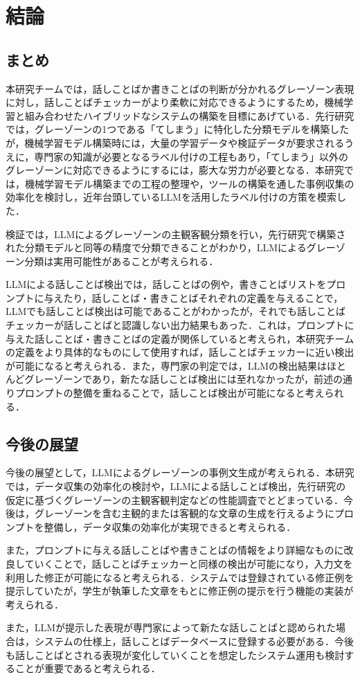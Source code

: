 \chapter{結論 \label{c8}}

\section{まとめ}
本研究チームでは，話しことばか書きことばの判断が分かれるグレーゾーン表現に対し，話しことばチェッカーがより柔軟に対応できるようにするため，機械学習と組み合わせたハイブリッドなシステムの構築を目標にあげている．先行研究では，グレーゾーンの1つである「てしまう」に特化した分類モデルを構築したが，機械学習モデル構築時には，大量の学習データや検証データが要求されるうえに，専門家の知識が必要となるラベル付けの工程もあり，「てしまう」以外のグレーゾーンに対応できるようにするには，膨大な労力が必要となる．本研究では，機械学習モデル構築までの工程の整理や，ツールの構築を通した事例収集の効率化を検討し，近年台頭しているLLMを活用したラベル付けの方策を模索した．

検証では，LLMによるグレーゾーンの主観客観分類を行い，先行研究で構築された分類モデルと同等の精度で分類できることがわかり，LLMによるグレーゾーン分類は実用可能性があることが考えられる．

LLMによる話しことば検出では，話しことばの例や，書きことばリストをプロンプトに与えたり，話しことば・書きことばそれぞれの定義を与えることで，LLMでも話しことば検出は可能であることがわかったが，それでも話しことばチェッカーが話しことばと認識しない出力結果もあった．これは，プロンプトに与えた話しことば・書きことばの定義が関係していると考えられ，本研究チームの定義をより具体的なものにして使用すれば，話しことばチェッカーに近い検出が可能になると考えられる．また，専門家の判定では，LLMの検出結果はほとんどグレーゾーンであり，新たな話しことば検出には至れなかったが，前述の通りプロンプトの整備を重ねることで，話しことば検出が可能になると考えられる．

\section{今後の展望}
今後の展望として，LLMによるグレーゾーンの事例文生成が考えられる．本研究では，データ収集の効率化の検討や，LLMによる話しことば検出，先行研究の仮定に基づくグレーゾーンの主観客観判定などの性能調査でとどまっている．今後は，グレーゾーンを含む主観的または客観的な文章の生成を行えるようにプロンプトを整備し，データ収集の効率化が実現できると考えられる．

また，プロンプトに与える話しことばや書きことばの情報をより詳細なものに改良していくことで，話しことばチェッカーと同様の検出が可能になり，入力文を利用した修正が可能になると考えられる．システムでは登録されている修正例を提示していたが，学生が執筆した文章をもとに修正例の提示を行う機能の実装が考えられる．

また，LLMが提示した表現が専門家によって新たな話しことばと認められた場合は，システムの仕様上，話しことばデータベースに登録する必要がある．今後も話しことばとされる表現が変化していくことを想定したシステム運用も検討することが重要であると考えられる．

